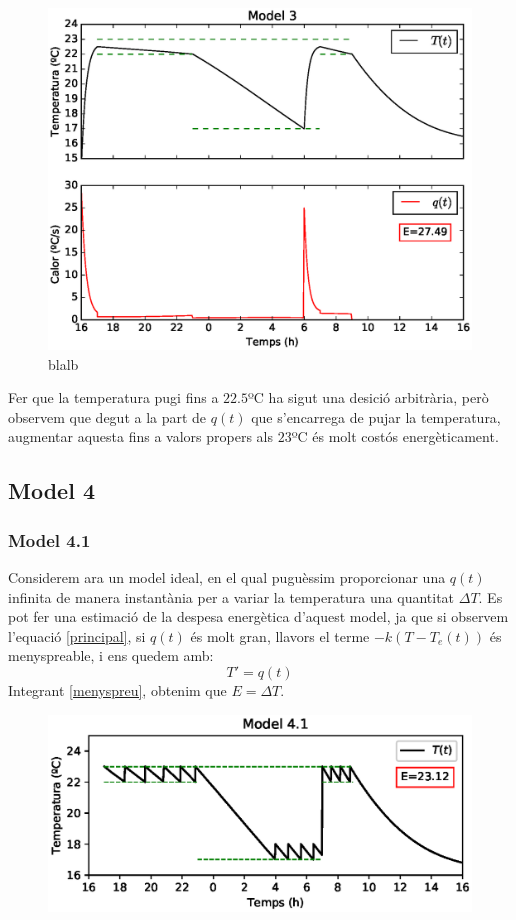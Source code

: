 \documentclass[11pt]{article}
\begin{document}
\begin{figure}[h!]
	\centering
	\includegraphics[width=12cm]{model3.eps}
	\caption{blalb}
	\label{figmodel3}
\end{figure}

Fer que la temperatura pugi fins a $22.5$ºC ha sigut una desició arbitrària, però observem que degut a la part de $q(t)$ que s'encarrega de pujar la temperatura, augmentar aquesta fins a valors propers als $23$ºC és molt costós energèticament. 
\subsection*{Model 4}
\subsubsection*{Model 4.1}
Considerem ara un model ideal, en el qual puguèssim proporcionar una $q(t)$ infinita de manera instantània per a variar la temperatura una quantitat $\Delta T$. Es pot fer una estimació de la despesa energètica d'aquest model, ja que si observem l'equació \eqref{principal}, si $q(t)$ és molt gran, llavors el terme $-k(T-T_e(t))$ és menyspreable, i ens quedem amb:
\begin{equation}\label{menyspreu}
	T'=q(t)
\end{equation}
Integrant \eqref{menyspreu}, obtenim que $E=\Delta T$.
\begin{figure}[h!]
	\centering
	\includegraphics[width=13cm]{model41.eps}
\end{figure}
\end{document}

